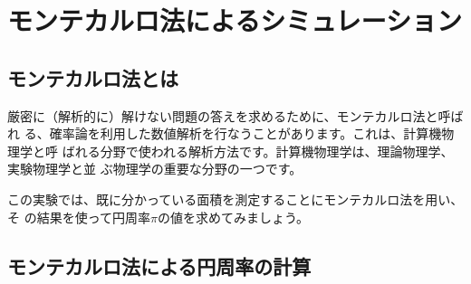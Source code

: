 %
%


\section{モンテカルロ法によるシミュレーション}

\subsection{モンテカルロ法とは }

厳密に（解析的に）解けない問題の答えを求めるために、モンテカルロ法と呼ばれ 
る、確率論を利用した数値解析を行なうことがあります。これは、計算機物理学と呼 
ばれる分野で使われる解析方法です。計算機物理学は、理論物理学、実験物理学と並 
ぶ物理学の重要な分野の一つです。

この実験では、既に分かっている面積を測定することにモンテカルロ法を用い、そ 
の結果を使って円周率$\pi$の値を求めてみましょう。 

\subsection{モンテカルロ法による円周率の計算}
\label{MC:keisan}

